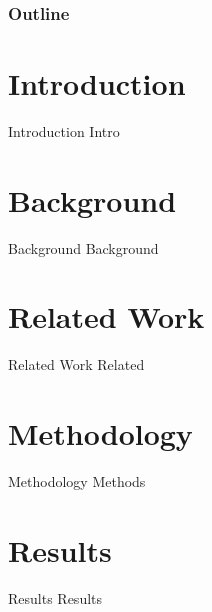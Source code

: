 


	\maketitle

	\begin{frame}
		\frametitle{Outline}
		\tableofcontents
	\end{frame}
\setlength{\belowcaptionskip}{-1.5em}

\section{Introduction}
	\begin{frame}{Introduction}
		Intro
	\end{frame}

\section{Background}
	\begin{frame}{Background}
		Background
	\end{frame}

\section{Related Work}
	\begin{frame}{Related Work}
		Related
	\end{frame}

\section{Methodology}
	\begin{frame}{Methodology}
		Methods
	\end{frame}

\section{Results}
	\begin{frame}{Results}
		Results
	\end{frame}

